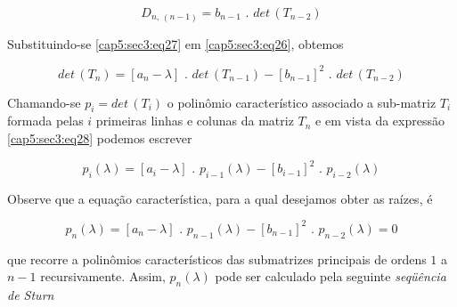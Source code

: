\begin{equation}
\label{cap5:sec3:eq27}
D_{n, \, (n-1)} = b_{n-1} \, \, . \, \, det \, (T_{n-2})
\end{equation}

Substituindo-se \ref{cap5:sec3:eq27} em \ref{cap5:sec3:eq26}, obtemos

\begin{equation}
\label{cap5:sec3:eq28}
det \, (T_n) = [a_n - \lambda] \, \, . \, \, det \, (T_{n-1}) - [b_{n-1}]^2 \, \, . \, \, det \, (T_{n-2})
\end{equation}

Chamando-se $ p_i = det \, (T_i) $ o polinômio característico associado a sub-matriz $ T_i $ formada pelas $ i $ primeiras linhas e colunas da matriz $ T_n $ e em vista da expressão \ref{cap5:sec3:eq28} podemos escrever

\begin{equation}
\label{cap5:sec3:eq29}
p_i(\lambda) = [a_i - \lambda] \, \, . \, \, p_{i-1}(\lambda) - [b_{i-1}]^2 \, \, . \, \, p_{i-2}(\lambda)
\end{equation}

Observe que a equação característica, para a qual desejamos obter as raízes, é

\begin{equation}
\label{cap5:sec3:eq30}
p_n(\lambda) = [a_n - \lambda] \, \, . \, \, p_{n-1}(\lambda) - [b_{n-1}]^2 \, \, . \, \, p_{n-2}(\lambda) = 0
\end{equation}

\noindent
que recorre a polinômios característicos das submatrizes principais de ordens $1$ a $n-1$ recursivamente. Assim, $p_n(\lambda)$ pode ser calculado pela seguinte \textit{seqüência de Sturn}

